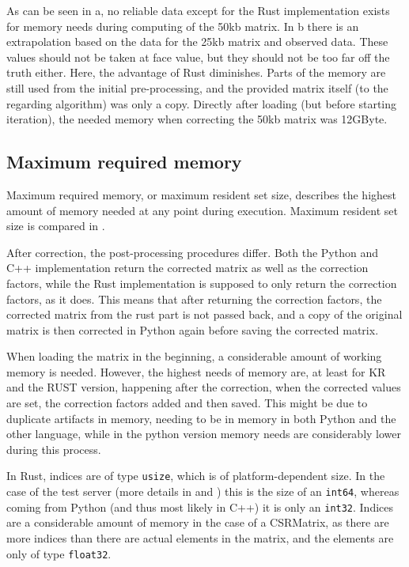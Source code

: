 As can be seen in a, no reliable data except for the Rust
implementation exists for memory needs during computing of the 50kb matrix. In
b there is an extrapolation based on the data for the
25kb matrix and observed data. These values should not be taken at face value,
but they should not be too far off the truth either. Here, the advantage of Rust
diminishes. Parts of the memory are still used from the initial pre-processing,
and the provided matrix itself (to the regarding algorithm) was only a copy.
Directly after loading (but before starting iteration), the needed memory when
correcting the 50kb matrix was 12GByte.


\subsection{Maximum required memory}\label{sec:maxmem}



Maximum required memory, or maximum resident set size, describes the highest
amount of memory needed at any point during execution. Maximum resident set size
is compared in .

After correction, the post-processing procedures differ. Both the Python and
C++ implementation return the corrected matrix as well as the correction
factors, while the Rust implementation is supposed to only return the
correction factors, as it does. This means that after returning the correction
factors, the corrected matrix from the rust part is not passed back, and a copy
of the original matrix is then corrected in Python again before saving the
corrected matrix.

When loading the matrix in the beginning, a considerable amount of working
memory is needed. However, the highest needs of memory are, at least for KR and
the RUST version, happening after the correction, when the corrected values are
set, the correction factors added and then saved. This might be due to
duplicate artifacts in memory, needing to be in memory in both Python and
the other language, while in the python version memory needs are considerably
lower during this process.

In Rust, indices are of type \verb|usize|, which is of platform-dependent size.
In the case of the test server (more details in  and
) this is the size of an \verb|int64|, whereas coming from
Python (and thus most likely in C++) it is only an \verb|int32|. Indices are a
considerable amount of memory in the case of a CSRMatrix, as there are more
indices than there are actual elements in the matrix, and the elements are only
of type \verb|float32|.

